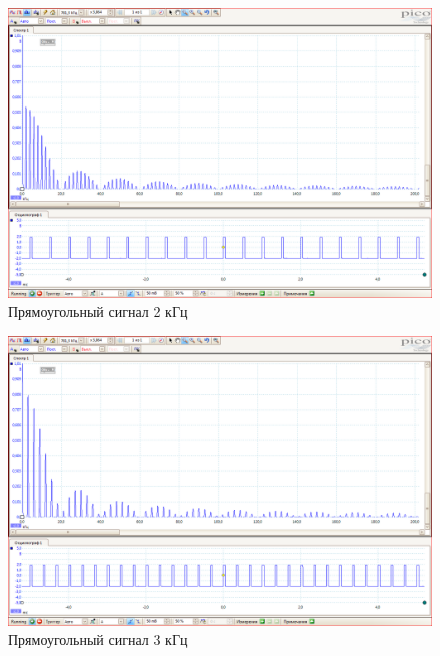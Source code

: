\documentclass[a4paper]{article}
\begin{document}
\begin{figure}[h!]
    \centering
    \includegraphics[width=0.5\pdfpagewidth]{Прямоугольный сигнал 2 кГц.PNG}
    \caption{Прямоугольный сигнал 2 кГц}
\end{figure}

\begin{figure}[h!]
    \centering
    \includegraphics[width=0.5\pdfpagewidth]{Прямоугольный сигнал 3 кГц.PNG}
    \caption{Прямоугольный сигнал 3 кГц}
\end{figure}
\end{document}
